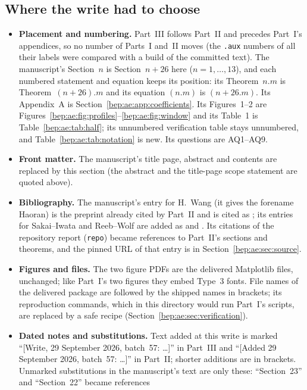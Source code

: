 \documentclass[11pt]{article}
\numberwithin{equation}{section}
\theoremstyle{definition}
\theoremstyle{remark}
\begin{document}
\subsection{Where the write had to choose}\label{bep:ae:sec:choices}
\begin{itemize}
\item \textbf{Placement and numbering.} Part~III follows Part~II and
precedes Part~I's appendices, so no number of Parts~I and~II moves (the
\texttt{.aux} numbers of all their labels were compared with a build of
the committed text). The manuscript's Section~$n$ is Section~$n+26$ here
($n=1,\ldots,13$), and each numbered statement and equation keeps its
position: its Theorem~$n.m$ is Theorem~$(n+26).m$ and its equation
$(n.m)$ is $(n+26.m)$. Its Appendix~A is
Section~\ref{bep:ae:app:coefficients}. Its Figures~1--2 are
Figures~\ref{bep:ae:fig:profiles}--\ref{bep:ae:fig:window} and its
Table~1 is Table~\ref{bep:ae:tab:half}; its unnumbered verification
table stays unnumbered, and Table~\ref{bep:ae:tab:notation} is new. Its
questions are AQ1--AQ9.
\item \textbf{Front matter.} The manuscript's title page, abstract and
contents are replaced by this section (the abstract and the title-page
scope statement are quoted above).
\item \textbf{Bibliography.} The manuscript's entry for H.~Wang (it gives
the forename Haoran) is the preprint already cited by Part~II and is
cited as \cite{bep:pe:Wang}; its entries for Sakai--Iwata and Reeb--Wolf
are added as \cite{bep:ae:sakai} and \cite{bep:ae:reeb}. Its citations of
the repository report (\texttt{repo}) became references to Part~II's
sections and theorems, and the pinned URL of that entry is in
Section~\ref{bep:ae:sec:source}.
\item \textbf{Figures and files.} The two figure PDFs are the delivered
Matplotlib files, unchanged; like Part~I's two figures they embed Type~3
fonts. File names of the delivered package are followed by the shipped
names in brackets; its reproduction commands, which in this directory
would run Part~I's scripts, are replaced by a safe recipe
(Section~\ref{bep:ae:sec:verification}).
\item \textbf{Dated notes and substitutions.} Text added at this write is
marked ``[Write, 29 September 2026, batch~57: \ldots]'' in Part~III and
``[Added 29 September 2026, batch~57: \ldots]'' in Part~II; shorter
additions are in brackets. Unmarked substitutions in the manuscript's
text are only these: ``Section~23'' and ``Section~22'' became references

\end{itemize}
\end{document}
